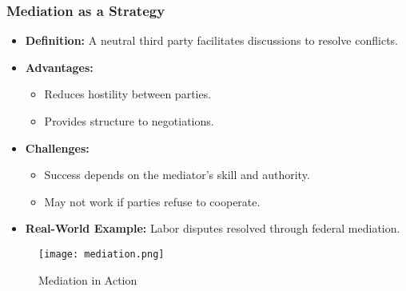 \documentclass[10pt]{beamer}
\begin{document}
    \begin{frame}
        \frametitle{Mediation as a Strategy}
        \begin{itemize}
            \item \textbf{Definition:} A neutral third party facilitates discussions to resolve conflicts.
            \item \textbf{Advantages:}
                \begin{itemize}
                    \item Reduces hostility between parties.
                    \item Provides structure to negotiations.
                \end{itemize}
            \item \textbf{Challenges:}
                \begin{itemize}
                    \item Success depends on the mediator's skill and authority.
                    \item May not work if parties refuse to cooperate.
                \end{itemize}
            \item \textbf{Real-World Example:} Labor disputes resolved through federal mediation.
        \end{itemize}
        
        \begin{figure}
            \centering
            \texttt{[image: mediation.png]}
            \caption{Mediation in Action}
        \end{figure}
        \end{frame}
        
\end{document}
